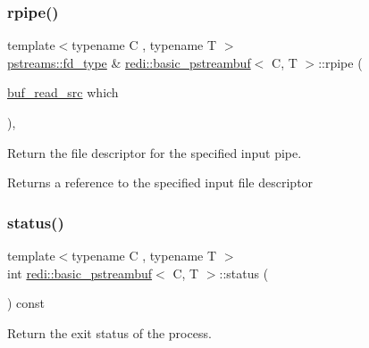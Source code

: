 \subsubsection{\texorpdfstring{rpipe()}{rpipe()}\hspace{0.1cm}{\footnotesize\ttfamily [2/2]}}
{\footnotesize\ttfamily template$<$typename C , typename T $>$ \\
\mbox{\hyperlink{structredi_1_1pstreams_add0b7eaed16eb6c22a56012958d85b1d}{pstreams\+::fd\+\_\+type}} \& \mbox{\hyperlink{classredi_1_1basic__pstreambuf}{redi\+::basic\+\_\+pstreambuf}}$<$ C, T $>$\+::rpipe (\begin{DoxyParamCaption}\item[{\mbox{\hyperlink{classredi_1_1basic__pstreambuf_a8a3f6a830b6035ed755188e32ffffadc}{buf\+\_\+read\+\_\+src}}}]{which }\end{DoxyParamCaption})\hspace{0.3cm}{\ttfamily [inline]}, {\ttfamily [protected]}}



Return the file descriptor for the specified input pipe. 

\begin{DoxyReturn}{Returns}
a reference to the specified input file descriptor 
\end{DoxyReturn}
\mbox{\label{classredi_1_1basic__pstreambuf_a2ad82c80f955784adfd34a1608a15193}} 
\subsubsection{\texorpdfstring{status()}{status()}}
{\footnotesize\ttfamily template$<$typename C , typename T $>$ \\
int \mbox{\hyperlink{classredi_1_1basic__pstreambuf}{redi\+::basic\+\_\+pstreambuf}}$<$ C, T $>$\+::status (\begin{DoxyParamCaption}{ }\end{DoxyParamCaption}) const\hspace{0.3cm}{\ttfamily [inline]}}



Return the exit status of the process. 

